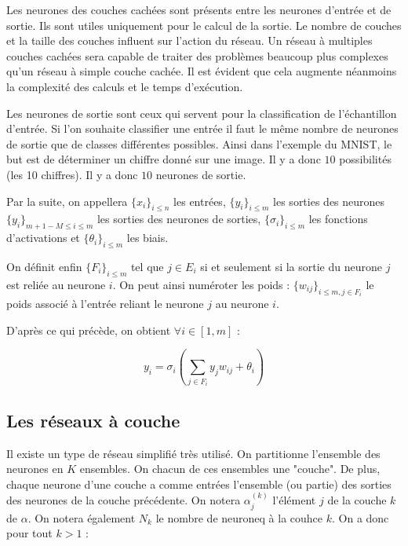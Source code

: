 \medskip

Les neurones des couches cachées sont présents entre les neurones d'entrée et de
sortie. Ils sont utiles uniquement pour le calcul de la sortie. Le nombre de
couches et la taille des couches influent sur l'action du réseau. Un réseau à
multiples couches cachées sera capable de traiter des problèmes beaucoup plus
complexes qu'un réseau à simple couche cachée. Il est évident que cela augmente
néanmoins la complexité des calculs et le temps d'exécution.

\medskip

Les neurones de sortie sont ceux qui servent pour la classification de
l'échantillon d'entrée. Si l'on souhaite classifier une entrée il faut le même
nombre de neurones de sortie que de classes différentes possibles. Ainsi dans
l'exemple du MNIST, le but est de déterminer un chiffre donné sur une image.
Il y a donc $10$ possibilités (les 10 chiffres). Il y a donc $10$ neurones de
sortie.

\medskip

Par la suite, on appellera $\{x_i\}_{i \leq n}$ les entrées, $\{y_i\}_{i \leq m}$
 les sorties des neurones $\{y_i\}_{m+1-M \leq i \leq m}$ les sorties des
neurones de sorties, $\{\sigma_i\}_{i \leq m}$ les fonctions d'activations et
$\{\theta_i\}_{i \leq m}$ les biais.

\medskip

On définit enfin $\{F_i\}_{i \leq m}$ tel que $j \in E_i$ si et seulement si la
sortie du neurone $j$ est reliée au neurone $i$. On peut ainsi numéroter les
poids : $\{w_{ij}\}_{i \leq m, j \in F_i} $ le poids associé à l'entrée reliant
le neurone $j$ au neurone $i$.

\medskip

D'après ce qui précède, on obtient $\forall i \in [1, m]$ :

\[y_i = \sigma_i(\sum_{j \in F_i} y_jw_{ij} + \theta_i) \]

\subsection{Les réseaux à couche}

Il existe un type de réseau simplifié très utilisé. On partitionne l'ensemble
des neurones en $K$ ensembles. On chacun de ces ensembles une "couche". De plus,
chaque neurone d'une couche a comme entrées l'ensemble (ou partie) des sorties
des neurones de la couche précédente. On notera $\alpha^{(k)}_j$ l'élément $j$
de la couche $k$ de $\alpha$. On notera également $N_k$ le nombre de neuroneq à
la couhce $k$. On a donc pour tout $k > 1$ :


